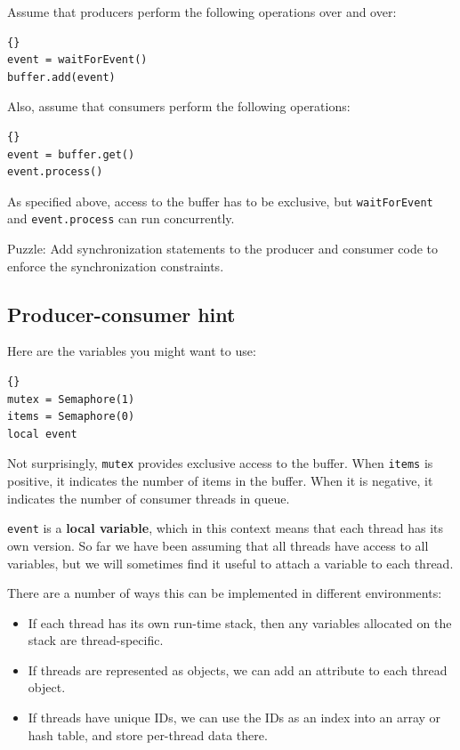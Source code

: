 \documentclass{book}
\newcommand{\clearemptydoublepage}{\newpage\cleardoublepage}
\begin{document}
Assume that producers perform the following operations over and
over:

\begin{lstlisting}[title={Basic producer code}]{}
event = waitForEvent()
buffer.add(event)
\end{lstlisting}

Also, assume that consumers perform the following operations:

\begin{lstlisting}[title={Basic consumer code}]{}
event = buffer.get()
event.process()
\end{lstlisting}

As specified above, access to the buffer has to be exclusive,
but {\tt waitForEvent} and {\tt event.process}
can run concurrently.

Puzzle: Add synchronization statements to the producer and
consumer code to enforce the synchronization constraints.

\clearemptydoublepage
\subsection{Producer-consumer hint}

Here are the variables you might want to use:

\begin{lstlisting}[title={Producer-consumer initialization}]{}
mutex = Semaphore(1)
items = Semaphore(0)
local event
\end{lstlisting}

Not surprisingly, {\tt mutex} provides exclusive access to
the buffer.  When {\tt items} is positive, it indicates the
number of items in the buffer.  When it is negative, it
indicates the number of consumer threads in queue.

{\tt event} is a {\bf local variable}, which in this context means
that each thread has its own version.
So far we have been assuming that all threads have access
to all variables, but we will sometimes find it useful to
attach a variable to each thread.

There are a number of ways this can be implemented in different
environments:

\begin{itemize}

\item If each thread has its own run-time stack, then any variables
allocated on the stack are thread-specific.

\item If threads are represented as objects, we can add an attribute
to each thread object.

\item If threads have unique IDs, we can use the IDs as an index
into an array or hash table, and store per-thread data there.

\end{itemize}
\end{document}
